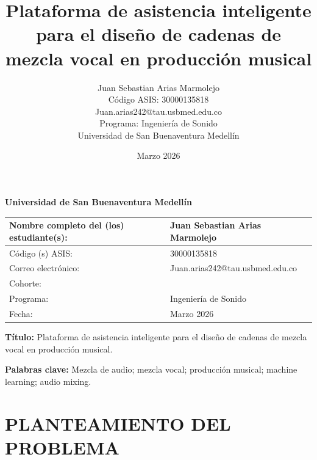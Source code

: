 \documentclass[12pt]{article}
\title{Plataforma de asistencia inteligente para el diseño de cadenas de mezcla vocal en producción musical}
\author{Juan Sebastian Arias Marmolejo \\ Código ASIS: 30000135818 \\ Juan.arias242@tau.usbmed.edu.co \\ Programa: Ingeniería de Sonido \\ Universidad de San Buenaventura Medellín}
\date{Marzo 2026}
\begin{document}

\begin{titlepage}
\centering
\vspace*{2cm}
{\LARGE \textbf{Universidad de San Buenaventura Medellín}\par}
\vspace{2cm}

\begin{tabular}{|p{6cm}|p{8cm}|}
\hline
Nombre completo del (los) estudiante(s): & Juan Sebastian Arias Marmolejo \\
\hline
Código (s) ASIS: & 30000135818 \\
\hline
Correo electrónico: & Juan.arias242@tau.usbmed.edu.co \\
\hline
Cohorte: & \\
\hline
Programa: & Ingeniería de Sonido \\
\hline
Fecha: & Marzo 2026 \\
\hline
\end{tabular}

\vspace{2cm}

{\Large \textbf{Título:} Plataforma de asistencia inteligente para el diseño de cadenas de mezcla vocal en producción musical.\par}

\vspace{1cm}

{\large \textbf{Palabras clave:} Mezcla de audio; mezcla vocal; producción musical; machine learning; audio mixing.\par}

\vfill
\end{titlepage}

\tableofcontents
\clearpage

\listoftables
\clearpage

\listoffigures
\clearpage


\section{PLANTEAMIENTO DEL PROBLEMA}
\end{document}
